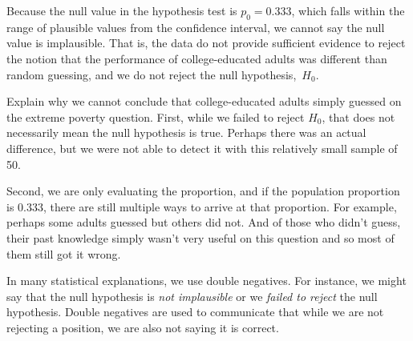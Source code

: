 Because the null value in the hypothesis test is $p_0 = 0.333$,
which falls within the range of plausible values from the
confidence interval, we cannot say the null value is implausible.
That is, the data do not provide sufficient evidence to reject
the notion that the performance of college-educated
adults was different than random guessing,
and we do not reject the null hypothesis,~$H_0$.

\begin{example}{Explain why we cannot conclude that
    college-educated adults simply guessed on the extreme
    poverty question.}
  First, while we failed to reject $H_0$, that does not
  necessarily mean the null hypothesis is true.
  Perhaps there was an actual difference,
  but we were not able to detect it with this
  relatively small sample of 50.

  Second, we are only evaluating the proportion,
  and if the population proportion is 0.333,
  there are still multiple ways to arrive at that proportion.
  For example,
  perhaps some adults guessed but others did not.
  And of those who didn't guess,
  their past knowledge simply wasn't very useful on this
  question and so most of them still got it wrong.
\end{example}

\begin{tipBox}{
In many statistical explanations, we use double negatives. For instance, we might say that the null hypothesis is \emph{not implausible} or we \emph{failed to reject} the null hypothesis. Double negatives are used to communicate that while we are not rejecting a position, we are also not saying it is correct.}
\end{tipBox}

